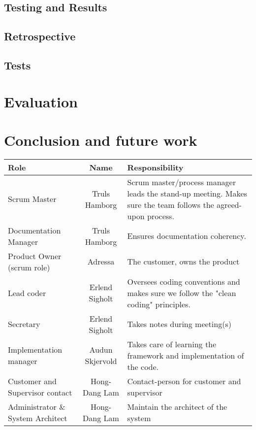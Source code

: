 \documentclass[12pt, a4paper]{article}
\begin{document}
\subsection{Testing and Results}
\subsection{Retrospective}


\subsection{Tests}

\section{Evaluation}


\section{Conclusion and future work}

\begin{center}
  \begin{tabular}{| l  c  b{5cm}|}
    \hline
    Role & Name & Responsibility \\ \hline 
    Scrum Master & Truls Hamborg &  Scrum master/process manager leads the stand-up meeting. Makes sure the team follows the agreed-upon process. \\ \hline
    Documentation Manager & Truls Hamborg &  Ensures documentation coherency. \\ \hline
    Product Owner (scrum role) & Adressa & The customer, owns the product\\ \hline
    Lead coder & Erlend Sigholt & Oversees coding conventions and makes sure we follow the "clean coding" principles. \\ \hline
    Secretary & Erlend Sigholt & Takes notes during meeting(s) \\ \hline
    Implementation manager & Audun Skjervold & Takes care of learning the framework and implementation of the code.\\ \hline
    Customer and Supervisor contact & Hong-Dang Lam & Contact-person for customer and supervisor \\ \hline
    Administrator \& System Architect & Hong-Dang Lam & Maintain the architect of the system \\
    \hline
  \end{tabular}
\end{center}


 
 
\end{document}

